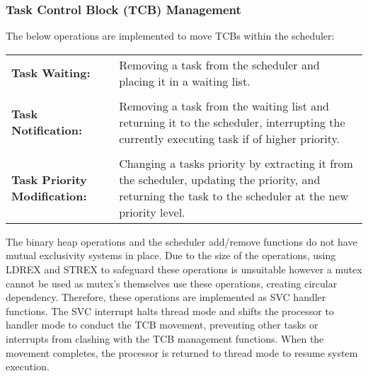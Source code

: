 \subsubsection{Task Control Block (TCB) Management}
The below operations are implemented to move TCBs within the scheduler:
\setlength\tabcolsep{0pt}
\begin{center}
	\begin{tabularx}{1\textwidth}{ p{} p{} }
		\textbf{Task Waiting:}	& Removing a task from the scheduler and placing it in a waiting list.\\
		
		&\\
		
		\textbf{Task Notification:}	& Removing a task from the waiting list and returning it to the scheduler, interrupting the currently executing task if of higher priority.\\
		
		&\\
		
		\textbf{Task Priority \newline Modification:} 	& Changing a tasks priority by extracting it from the scheduler, updating the priority, and returning the task to the scheduler at the new priority level. \\
	\end{tabularx}
\end{center}
The binary heap operations and the scheduler add/remove functions do not have mutual exclusivity systems in place. Due to the size of the operations, using LDREX and STREX to safeguard these operations is unsuitable however a mutex cannot be used as mutex’s themselves use these operations, creating circular dependency. Therefore, these operations are implemented as SVC handler functions. The SVC interrupt halts thread mode and shifts the processor to handler mode to conduct the TCB movement, preventing other tasks or interrupts from clashing with the TCB management functions. When the movement completes, the processor is returned to thread mode to resume system execution.